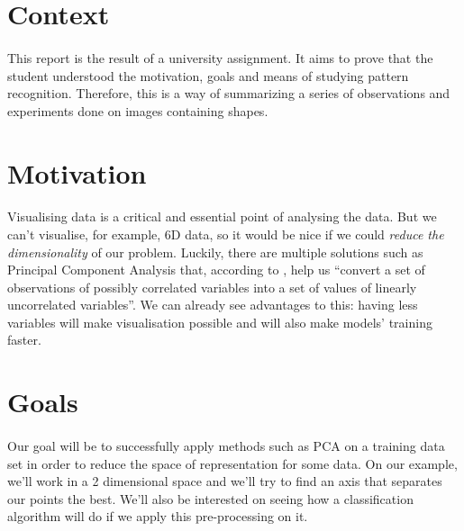 \section{Context}
\paragraph{}
This report is the result of a university assignment.
It aims to prove that the student understood the motivation, goals and means of studying pattern recognition.
Therefore, this is a way of summarizing a series of observations and experiments done on images containing shapes.

\section{Motivation}
\paragraph{}
Visualising data is a critical and essential point of analysing the data.
But we can't visualise, for example, 6D data, so it would be nice if we could \emph{reduce the dimensionality} of our problem.
Luckily, there are multiple solutions such as Principal Component Analysis that, according to \cite{pca}, help us ``convert a set of observations of possibly correlated variables into a set of values of linearly uncorrelated variables''.
We can already see advantages to this: having less variables will make visualisation possible and will also make models' training faster.

\section{Goals}
\paragraph{}
Our goal will be to successfully apply methods such as PCA on a training data set in order to reduce the space of representation for some data.
On our example, we'll work in a 2 dimensional space and we'll try to find an axis that separates our points the best.
We'll also be interested on seeing how a classification algorithm will do if we apply this pre-processing on it.